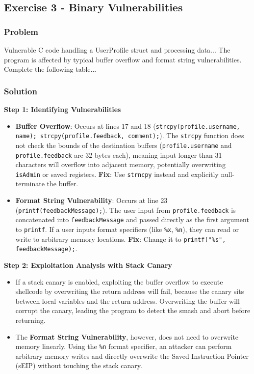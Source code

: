 \documentclass{article}
\begin{document}
\subsection{Exercise 3 - Binary Vulnerabilities}
\subsubsection*{Problem}
Vulnerable C code handling a UserProfile struct and processing data... The program is affected by typical buffer overflow and format string vulnerabilities. Complete the following table...

\subsubsection*{Solution}
\textbf{Step 1: Identifying Vulnerabilities}
\begin{itemize}
    \item[\textbf{1.}] \textbf{Buffer Overflow}: Occurs at lines 17 and 18 (\texttt{strcpy(profile.username, name); strcpy(profile.feedback, comment);}). The \texttt{strcpy} function does not check the bounds of the destination buffers (\texttt{profile.username} and \texttt{profile.feedback} are 32 bytes each), meaning input longer than 31 characters will overflow into adjacent memory, potentially overwriting \texttt{isAdmin} or saved registers. \textbf{Fix}: Use \texttt{strncpy} instead and explicitly null-terminate the buffer.
    \item[\textbf{2.}] \textbf{Format String Vulnerability}: Occurs at line 23 (\texttt{printf(feedbackMessage);}). The user input from \texttt{profile.feedback} is concatenated into \texttt{feedbackMessage} and passed directly as the first argument to \texttt{printf}. If a user inputs format specifiers (like \texttt{\%x}, \texttt{\%n}), they can read or write to arbitrary memory locations. \textbf{Fix}: Change it to \texttt{printf("\%s", feedbackMessage);}.

\end{itemize}
\textbf{Step 2: Exploitation Analysis with Stack Canary}
\begin{itemize}
    \item If a stack canary is enabled, exploiting the buffer overflow to execute shellcode by overwriting the return address will fail, because the canary sits between local variables and the return address. Overwriting the buffer will corrupt the canary, leading the program to detect the smash and abort before returning.
    \item The \textbf{Format String Vulnerability}, however, does not need to overwrite memory linearly. Using the \texttt{\%n} format specifier, an attacker can perform arbitrary memory writes and directly overwrite the Saved Instruction Pointer (sEIP) without touching the stack canary.

\end{itemize}
\end{document}
